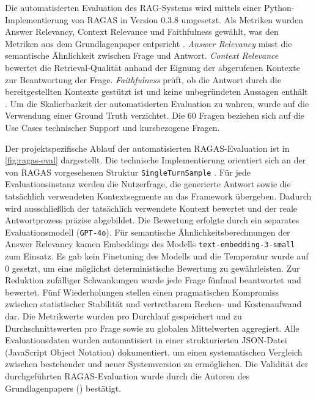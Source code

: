 Die automatisierten Evaluation des RAG-Systems wird mittels einer Python-Implementierung von RAGAS in Version 0.3.8 umgesetzt. Als Metriken wurden Answer Relevancy, Context Relevance und Faithfulness gewählt, was den Metriken aus dem Grundlagenpaper entpsricht \cite{es2025ragas}. \textit{Answer Relevancy} misst die semantische Ähnlichkeit zwischen Frage und Antwort. \textit{Context Relevance} bewertet die Retrieval-Qualität anhand der Eignung der abgerufenen Kontexte zur Beantwortung der Frage. \textit{Faithfulness} prüft, ob die Antwort durch die bereitgestellten Kontexte gestützt ist und keine unbegründeten Aussagen enthält \cite{es2025ragas}. Um die Skalierbarkeit der automatisierten Evaluation zu wahren, wurde auf die Verwendung einer Ground Truth verzichtet. Die 60 Fragen beziehen sich auf die Use Cases technischer Support und kursbezogene Fragen.

Der projektspezifische Ablauf der automatisierten RAGAS-Evaluation ist in \autoref{fig:ragas-eval} dargestellt. Die technische Implementierung orientiert sich an der von RAGAS vorgesehenen Struktur \texttt{SingleTurnSample} \cite{ragasdocs}. Für jede Evaluationsinstanz werden die Nutzerfrage, die generierte Antwort sowie die tatsächlich verwendeten Kontextsegmente an das Framework übergeben. Dadurch wird ausschließlich der tatsächlich verwendete Kontext bewertet und der reale Antwortprozess präzise abgebildet. Die Bewertung erfolgte durch ein separates Evaluationsmodell (\texttt{GPT-4o}). Für semantische Ähnlichkeitsberechnungen der Answer Relevancy kamen Embeddings des Modells \texttt{text-embedding-3-small} zum Einsatz. Es gab kein Finetuning des Modells und die Temperatur wurde auf 0 gesetzt, um eine möglichst deterministische Bewertung zu gewährleisten. Zur Reduktion zufälliger Schwankungen wurde jede Frage fünfmal beantwortet und bewertet. Fünf Wiederholungen stellen einen pragmatischen Kompromiss zwischen statistischer Stabilität und vertretbarem Rechen- und Kostenaufwand dar. Die Metrikwerte wurden pro Durchlauf gespeichert und zu Durchschnittswerten pro Frage sowie zu globalen Mittelwerten aggregiert. Alle Evaluationsdaten wurden automatisiert in einer strukturierten JSON-Datei (JavaScript Object Notation) dokumentiert, um einen systematischen Vergleich zwischen bestehender und neuer Systemversion zu ermöglichen. Die Validität der durchgeführten RAGAS-Evaluation wurde durch die Autoren des Grundlagenpapers (\citeauthor{es2025ragas}) bestätigt.

